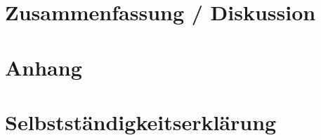 \documentclass[english,12pt,doc]{apa}
\begin{document}
\blindtext
\section{Zusammenfassung / Diskussion}
\blindtext
\blindtext

\newpage
 

\newpage
\section{Anhang}
\blindtext
\newpage
\section{Selbstständigkeitserklärung}
\blindtext
\begin{comment}
I declare that this work titled ``\title'' has been composed by myself, and describes my own work, unless otherwise acknowledged in the 
text.  

If the paper has been authored by more than one person, I confirm that all parts of the paper have been clearly assigned to the respective author.

This work has not been and will not be submitted  for any other degree or the obtaining of ECTS points at the University of Zurich or any other institution of higher education. 

All sentences or passages quoted in this paper  from other people's work have been specifically acknowledged by clear cross-referencing to author, work and page(s). Any illustrations which are not the work of the author have been used with the  explicit permission of the originator and are specifically acknowledged.  

I understand that failure to specifically acknowledge all used work amounts to plagiarism and will be considered grounds for failure and will have judicial and disciplinary consequences according §7ff of the ``Disziplinarordnung der Universität Zürich'' as well as § 36 of the ``Rahmenordnung für das Studium in den Bachelor- und Master-Studiengängen der Philosophischen Fakultät der Universität Zürich''. 

With my signature I declare the accuracy of these specifications.
\\
\\
Name: Markus Graf\\
Matriculation number:  08-91271-9\\
\\
\\
\\
\\
\\
\\
............................................................................\\
Zürich, \today
\end{comment}
\end{document}
